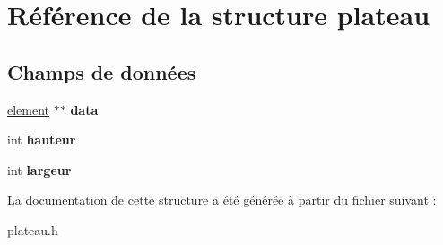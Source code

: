 \hypertarget{structplateau}{\section{Référence de la structure plateau}
\label{structplateau}
}
\subsection*{Champs de données}
\begin{DoxyCompactItemize}
\item 
\hypertarget{structplateau_a551670e62478e25840b329270fcb9eb6}{\hyperlink{structelement}{element} $\ast$$\ast$ {\bfseries data}}\label{structplateau_a551670e62478e25840b329270fcb9eb6}

\item 
\hypertarget{structplateau_a5e94a2f98c16e8b6860f95c99da1c0d3}{int {\bfseries hauteur}}\label{structplateau_a5e94a2f98c16e8b6860f95c99da1c0d3}

\item 
\hypertarget{structplateau_a74f0f2591e5f65bf792b2c3c67817d78}{int {\bfseries largeur}}\label{structplateau_a74f0f2591e5f65bf792b2c3c67817d78}

\end{DoxyCompactItemize}


La documentation de cette structure a été générée à partir du fichier suivant \-:\begin{DoxyCompactItemize}
\item 
plateau.\-h\end{DoxyCompactItemize}
